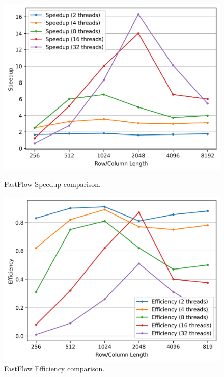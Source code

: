 \begin{figure}[h!]
    \begin{minipage}[t!]{0.49\textwidth}
        \centering
        \includegraphics[width=\textwidth]{img/FastFlow/ff_speedup.png}
        \caption{FastFlow Speedup comparison.}
        \label{FF_Speedup}
    \end{minipage}
    \hfill
    \begin{minipage}[t!]{0.49\textwidth}
        \centering
        \includegraphics[width=\textwidth]{img/FastFlow/ff_efficiency.png}
        \caption{FastFlow Efficiency comparison.}
        \label{FF_Efficiency}
    \end{minipage}


\end{figure}
